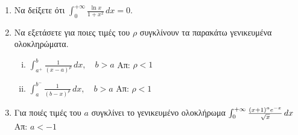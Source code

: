 \begin{enumerate}
  \item Να δείξετε ότι $ \int _{0}^{+\infty} \frac{\ln{x}}{1+x^{2}} \, dx = 0 $.

  \item Να εξετάσετε για ποιες τιμές του $\rho$ συγκλίνουν τα παρακάτω γενικευμένα 
    ολοκληρώματα.
    \begin{enumerate}[i)]
      \item $ \int _{a^+}^{b} \frac{1}{(x-a)^{\rho}} \,{dx}, \quad b>a $
        \hfill Απ: $ \rho <1 $  
      \item $ \int _{a}^{b^-} \frac{1}{(b-x)^{\rho}} \,{dx}, \quad b>a $
        \hfill Απ: $ \rho <1 $  
    \end{enumerate}

  \item Για ποιές τιμές του $a$ συγκλίνει το γενικευμένο ολοκλήρωμα
    \(
    \int _{0}^{+\infty} \frac{(x+1)^{a} e^{-x}}{\sqrt{x}} \,{dx} \hfill
    \) \hfill Απ: $ a<-1 $
\end{enumerate}



